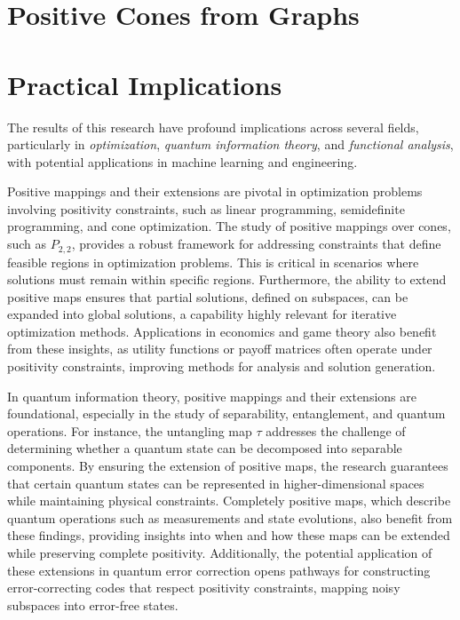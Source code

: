 \documentclass[11pt]{amsart}
\theoremstyle{definition}
\begin{document}
\section{Positive Cones from Graphs}

\section{Practical Implications}

The results of this research have profound implications across several fields, particularly in 
\textit{optimization}, \textit{quantum information theory}, and \textit{functional analysis}, with potential applications in machine learning and engineering.

Positive mappings and their extensions are pivotal in optimization problems involving positivity constraints, such as linear programming, semidefinite programming, and cone optimization. The study of positive mappings over cones, such as \( P_{2,2} \), provides a robust framework for addressing constraints that define feasible regions in optimization problems. This is critical in scenarios where solutions must remain within specific regions. Furthermore, the ability to extend positive maps ensures that partial solutions, defined on subspaces, can be expanded into global solutions, a capability highly relevant for iterative optimization methods. Applications in economics and game theory also benefit from these insights, as utility functions or payoff matrices often operate under positivity constraints, improving methods for analysis and solution generation.

In quantum information theory, positive mappings and their extensions are foundational, especially in the study of separability, entanglement, and quantum operations. For instance, the untangling map \( \tau \) addresses the challenge of determining whether a quantum state can be decomposed into separable components. By ensuring the extension of positive maps, the research guarantees that certain quantum states can be represented in higher-dimensional spaces while maintaining physical constraints. Completely positive maps, which describe quantum operations such as measurements and state evolutions, also benefit from these findings, providing insights into when and how these maps can be extended while preserving complete positivity. Additionally, the potential application of these extensions in quantum error correction opens pathways for constructing error-correcting codes that respect positivity constraints, mapping noisy subspaces into error-free states.
\end{document}
